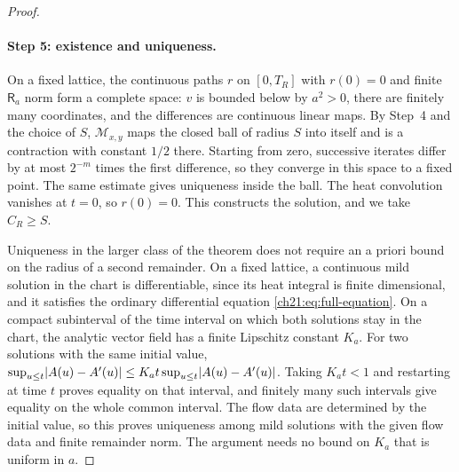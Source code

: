 \begin{proof}
\paragraph{Step 5: existence and uniqueness.}
On a fixed lattice, the continuous paths $r$ on $[0,T_R]$ with $r(0)=0$ and finite $\mathsf R_a$ norm form a complete space: $v$ is bounded below by $a^2>0$, there are finitely many coordinates, and the differences are continuous linear maps. By Step~4 and the choice of $S$, $\mathscr M_{x,y}$ maps the closed ball of radius $S$ into itself and is a contraction with constant $1/2$ there. Starting from zero, successive iterates differ by at most $2^{-m}$ times the first difference, so they converge in this space to a fixed point. The same estimate gives uniqueness inside the ball. The heat convolution vanishes at $t=0$, so $r(0)=0$. This constructs the solution, and we take $C_R\ge S$.

Uniqueness in the larger class of the theorem does not require an a priori bound on the radius of a second remainder. On a fixed lattice, a continuous mild solution in the chart is differentiable, since its heat integral is finite dimensional, and it satisfies the ordinary differential equation \eqref{ch21:eq:full-equation}. On a compact subinterval of the time interval on which both solutions stay in the chart, the analytic vector field has a finite Lipschitz constant $K_a$. For two solutions with the same initial value, $\sup_{u\le t}\lvert A(u)-A'(u)\rvert\le K_at\sup_{u\le t}\lvert A(u)-A'(u)\rvert$. Taking $K_at<1$ and restarting at time $t$ proves equality on that interval, and finitely many such intervals give equality on the whole common interval. The flow data are determined by the initial value, so this proves uniqueness among mild solutions with the given flow data and finite remainder norm. The argument needs no bound on $K_a$ that is uniform in $a$.


\end{proof}
